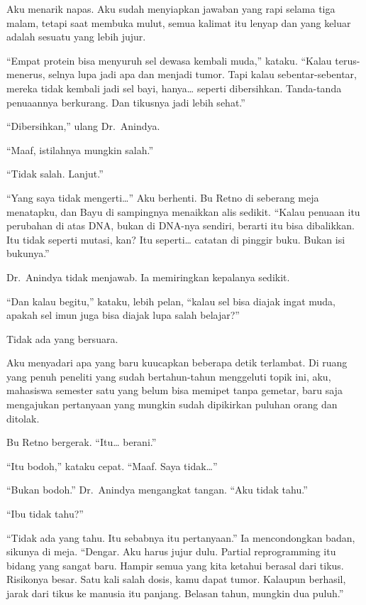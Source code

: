 \documentclass[11pt,twoside,openany]{book}
\begin{document}
Aku menarik napas. Aku sudah menyiapkan jawaban yang rapi selama tiga malam, tetapi saat membuka mulut, semua kalimat itu lenyap dan yang keluar adalah sesuatu yang lebih jujur.

``Empat protein bisa menyuruh sel dewasa kembali muda,'' kataku. ``Kalau terus-menerus, selnya lupa jadi apa dan menjadi tumor. Tapi kalau sebentar-sebentar, mereka tidak kembali jadi sel bayi, hanya\ldots{} seperti dibersihkan. Tanda-tanda penuaannya berkurang. Dan tikusnya jadi lebih sehat.''

``Dibersihkan,'' ulang Dr.~Anindya.

``Maaf, istilahnya mungkin salah.''

``Tidak salah. Lanjut.''

``Yang saya tidak mengerti\ldots{}'' Aku berhenti. Bu Retno di seberang meja menatapku, dan Bayu di sampingnya menaikkan alis sedikit. ``Kalau penuaan itu perubahan di atas DNA, bukan di DNA-nya sendiri, berarti itu bisa dibalikkan. Itu tidak seperti mutasi, kan? Itu seperti\ldots{} catatan di pinggir buku. Bukan isi bukunya.''

Dr.~Anindya tidak menjawab. Ia memiringkan kepalanya sedikit.

``Dan kalau begitu,'' kataku, lebih pelan, ``kalau sel bisa diajak ingat muda, apakah sel imun juga bisa diajak lupa salah belajar?''

Tidak ada yang bersuara.

Aku menyadari apa yang baru kuucapkan beberapa detik terlambat. Di ruang yang penuh peneliti yang sudah bertahun-tahun menggeluti topik ini, aku, mahasiswa semester satu yang belum bisa memipet tanpa gemetar, baru saja mengajukan pertanyaan yang mungkin sudah dipikirkan puluhan orang dan ditolak.

Bu Retno bergerak. ``Itu\ldots{} berani.''

``Itu bodoh,'' kataku cepat. ``Maaf. Saya tidak\ldots{}''

``Bukan bodoh.'' Dr.~Anindya mengangkat tangan. ``Aku tidak tahu.''

``Ibu tidak tahu?''

``Tidak ada yang tahu. Itu sebabnya itu pertanyaan.'' Ia mencondongkan badan, sikunya di meja. ``Dengar. Aku harus jujur dulu. Partial reprogramming itu bidang yang sangat baru. Hampir semua yang kita ketahui berasal dari tikus. Risikonya besar. Satu kali salah dosis, kamu dapat tumor. Kalaupun berhasil, jarak dari tikus ke manusia itu panjang. Belasan tahun, mungkin dua puluh.''
\end{document}
